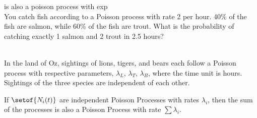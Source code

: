 \documentclass[answers,12pt,addpoints]{exam}
\begin{document}
\begin{questions}
\begin{solution}
    \end{solution}
     is also a poisson process with exp
     \\
    You catch fish according to a Poisson process with rate 2 per hour. 40\% of the fish are salmon, while 60\%
    of the fish are trout. What is the probability of catching exactly 1 salmon and 2 trout in 2.5 hours?\\
    \begin{solution}
        
    \end{solution}

    
    \\
    In the land of Oz, sightings of lions, tigers, and bears each follow a Poisson process with respective
    parameters, $\lambda_L$, $\lambda_T$, $\lambda_B$, where the time unit is hours. Sightings of the three species are independent of
    each other.
    \begin{solution}
        If $\setof{N_i(t)}$ are independent Poisson Processes with rates $\lambda_i$, then the sum of the processes is also a Poisson Process with rate $\sum \lambda_i$.\\
    \end{solution}

\end{questions}
\end{document}
